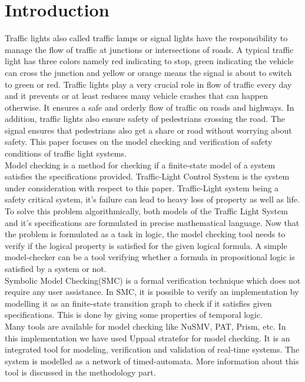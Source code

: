 \documentclass[conference]{IEEEtran}
\begin{document}
\IEEEpeerreviewmaketitle

\section{Introduction}

Traffic lights also called traffic lamps or signal lights have the responsibility to manage the flow of traffic at junctions or intersections of roads. A typical traffic light has three colors namely red indicating to stop, green indicating the vehicle can cross the junction and yellow or orange means the signal is about to switch to green or red. Traffic lights play a very crucial role in flow of traffic every day and it prevents or at least reduces many vehicle crashes that can happen otherwise. It ensures a safe and orderly flow of traffic on roads and highways. In addition, traffic lights also ensure safety of pedestrians crossing the road. The signal ensures that pedestrians also get a share or road without worrying about safety. This paper focuses on the model checking and verification of safety conditions of traffic light systems.
\\

Model checking is a method for checking if a finite-state model of a system satisfies the specifications provided. Traffic-Light Control System is the system under consideration with respect to this paper. Traffic-Light system being a safety critical system, it’s failure can lead to heavy loss of property as well as life. To solve this problem algorithmically, both models of the Traffic Light System and it’s specifications are formulated in precise mathematical language. Now that the problem is formulated as a task in logic, the model checking tool needs to verify if the logical property is satisfied for the given logical formula. A simple model-checker can be a tool verifying whether a formula in propositional logic is satisfied by a system or not.
\\

Symbolic Model Checking(SMC) is a formal verification  technique which does not require any user assistance. In SMC, it is possible to verify an implementation by modelling it as an finite-state transition graph to check if it satisfies given specifications. This is done by giving some properties of temporal logic.
\\

Many tools are available for model checking like NuSMV, PAT, Prism, etc. In this implementation we have used Uppaal stratefor for model checking. It is an integrated tool for modeling, verification and validation of real-time systems. The system is modelled as a network of timed-automata. More information about this tool is discussed in the methodology part.
\end{document}
